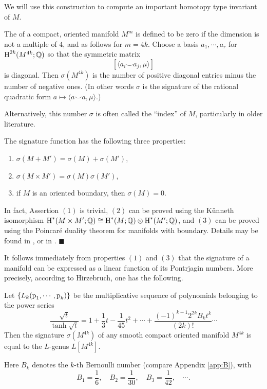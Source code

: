 \documentclass[../main]{subfiles}
\begin{document}
We will use this construction to compute an important homotopy type invariant of $M$.
\begin{definition}
The  of a compact, oriented manifold $M^m$ is defined to be zero if the dimension is not a multiple of $4$, and as follows for $m=4k$. Choose a basis $a_1,\cdots,a_r$ for $\operatorname{H}^{2k}(M^{4k};\mathbb{Q})$ so that the symmetric matrix \[[\langle a_i \smile a_j, \mu \rangle ]\] is diagonal. Then $\sigma(M^{4k})$ is the number of positive diagonal entries minus the number of negative ones. (In other words $\sigma$ is the signature of the rational quadratic form $a \mapsto \langle a \smile a, \mu \rangle$.)
\end{definition}
Alternatively, this number $\sigma$ is often called the ``index'' of $M$, particularly in older literature.

\begin{lemma}[Thom]
\label{lem:19.03}
The signature function has the following three properties:
\begin{enumerate}
    \item $\sigma(M +M') = \sigma(M) + \sigma(M')$,
    \item $\sigma(M \times M') = \sigma(M)\sigma(M')$,
    \item if $M$ is an oriented boundary, then $\sigma(M) = 0$.
\end{enumerate}
\end{lemma}
In fact, Assertion $(1)$ is trivial, $(2)$ can be proved using the Künneth isomorphism $\operatorname{H}^\ast(M \times M';\mathbb{Q}) \cong \operatorname{H}^\ast(M;\mathbb{Q}) \otimes \operatorname{H}^\ast(M';\mathbb{Q})$, and $(3)$ can be proved using the Poincaré duality theorem for manifolds with boundary. Details may be found in \cite[\S 8]{hirzebruchalggeo1966}, or in \cite[pp. 220-222]{stongcobordism1968}. \ensuremath{\blacksquare}

It follows immediately from properties $(1)$ and $(3)$ that the signature of a manifold can be expressed as a linear function of its Pontrjagin numbers. More precisely, according to Hirzebruch, one has the following.

\begin{theorem}
\label{thm:19.04}
Let $\{L_k(\operatorname{p}_1,\cdots,\operatorname{p}_k)\}$ be the multiplicative sequence of polynomials belonging to the power series \[\dfrac{\sqrt{t}}{\tanh \sqrt{t}} = 1 + \frac{1}{3} t - \frac{1}{45}t^2 + \cdots + \dfrac{(-1)^{k-1} 2^{2k}B_k t^k}{(2k)!} \cdots\] Then the signature $\sigma(M^{4k})$ of any smooth compact oriented manifold $M^{4k}$ is equal to the $L$-genus $L[M^{4k}]$.
\end{theorem}
Here $B_k$ denotes the $k$-th Bernoulli number (compare Appendix \ref{app:B}), with \[B_1 = \dfrac{1}{6},\quad B_2 = \dfrac{1}{30},\quad B_3 = \dfrac{1}{42},\quad \cdots .\]
\end{document}
